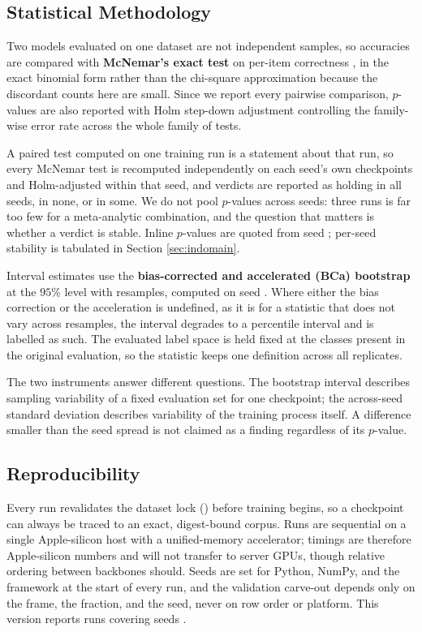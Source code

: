 \documentclass[runningheads]{llncs}
\begin{document}
\subsection{Statistical Methodology}
\label{sec:stats}

Two models evaluated on one dataset are not independent samples, so accuracies
are compared with \textbf{McNemar's exact test} on per-item correctness
\cite{mcnemar1947,dietterich1998tests}, in the exact binomial form rather than
the chi-square approximation because the discordant counts here are small. Since
we report every pairwise comparison, $p$-values are also reported with Holm
step-down adjustment \cite{holm1979} controlling the family-wise error rate
across the whole family of tests.

A paired test computed on one training run is a statement about that run, so
every McNemar test is recomputed independently on each seed's own checkpoints
and Holm-adjusted within that seed, and verdicts are reported as holding in all
seeds, in none, or in some. We do not pool $p$-values across seeds: three runs
is far too few for a meta-analytic combination, and the question that matters is
whether a verdict is stable. Inline $p$-values are quoted from seed \SigSeed{};
per-seed stability is tabulated in Section \ref{sec:indomain}.

Interval estimates use the \textbf{bias-corrected and accelerated (BCa)
bootstrap} \cite{efron1987bca} at the $95\%$ level with
\NBootstrap{} resamples, computed on seed \SigSeed{}. Where either the bias
correction or the acceleration is undefined, as it is for a statistic that does
not vary across resamples, the interval degrades to a percentile interval and is
labelled as such. The evaluated label space is held fixed at the classes present
in the original evaluation, so the statistic keeps one definition across all
replicates.

The two instruments answer different questions. The bootstrap interval describes
sampling variability of a fixed evaluation set for one checkpoint; the
across-seed standard deviation describes variability of the training process
itself. A difference smaller than the seed spread is not claimed as a finding
regardless of its $p$-value.

\subsection{Reproducibility}
\label{sec:repro}

Every run revalidates the dataset lock (\LockDigestFull{}) before training
begins, so a checkpoint can always be traced to an exact, digest-bound corpus.
Runs are sequential on a single Apple-silicon host with a unified-memory
accelerator; timings are therefore Apple-silicon numbers and will not transfer
to server GPUs, though relative ordering between backbones should. Seeds are set
for Python, NumPy, and the framework at the start of every run, and the
validation carve-out depends only on the frame, the fraction, and the seed,
never on row order or platform. This version reports \NRunsDone{} runs covering
seeds \SeedList{}.
\end{document}
